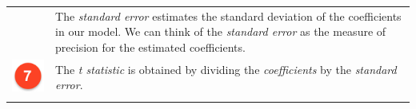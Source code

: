 \documentclass[]{article}
\begin{document}
\begin{longtable}[]{@{}ll@{}}
\begin{minipage}[t]{0.07\columnwidth}
\end{minipage} & \begin{minipage}[t]{0.87\columnwidth}\raggedright
The \emph{standard error} estimates the standard deviation of the coefficients in our model. We can think of the \emph{standard error} as the measure of precision for the estimated coefficients.\strut
\end{minipage}\tabularnewline
\begin{minipage}[t]{0.07\columnwidth}\raggedright
\includegraphics[width=1\textwidth,height=\textheight]{./img/circle7.png}\strut
\end{minipage} & \begin{minipage}[t]{0.87\columnwidth}\raggedright
The \emph{t statistic} is obtained by dividing the \emph{coefficients} by the \emph{standard error}.\strut
\end{minipage}\tabularnewline
\begin{minipage}[t]{0.07\columnwidth}\raggedright

\end{minipage}
\end{longtable}
\end{document}
